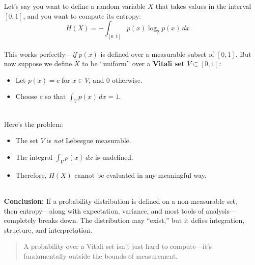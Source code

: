 \begin{example}[title={When Entropy Breaks: A Distribution on a Vitali Set}]
Let’s say you want to define a random variable \( X \) that takes values in the interval \([0,1]\), and you want to compute its entropy:
\[
H(X) = -\int_{[0,1]} p(x) \log_2 p(x)\, dx
\]
\\
This works perfectly—\emph{if} \( p(x) \) is defined over a measurable subset of \([0,1]\). But now suppose we define \( X \) to be “uniform” over a \textbf{Vitali set} \( V \subset [0,1] \):
\begin{itemize}
  \item Let \( p(x) = c \) for \( x \in V \), and 0 otherwise.
  \item Choose \( c \) so that \( \int_V p(x)\, dx = 1 \).
\end{itemize}
\ \\
Here’s the problem:
\begin{itemize}
  \item The set \( V \) is \emph{not} Lebesgue measurable.
  \item The integral \( \int_V p(x)\, dx \) is undefined.
  \item Therefore, \( H(X) \) cannot be evaluated in any meaningful way.
\end{itemize}
\ \\
\textbf{Conclusion:} If a probability distribution is defined on a non-measurable set, then entropy—along with expectation, variance, and most tools of analysis—completely breaks down. The distribution may “exist,” but it defies integration, structure, and interpretation.
\ \\
\begin{quote}
A probability over a Vitali set isn’t just hard to compute—it’s fundamentally outside the bounds of measurement.
\end{quote}
\end{example}







